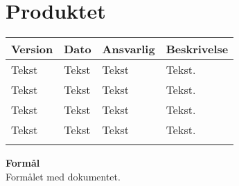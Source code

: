 \chapter{Produktet}\label{kapitel_Produktet}

\begin{longtabu} to 
    Version &    Dato &    Ansvarlig &    Beskrivelse\\[-1ex]
    \midrule
    Tekst &    Tekst &    Tekst &    Tekst.\\
    Tekst &    Tekst &    Tekst &    Tekst.\\
    Tekst &    Tekst &    Tekst &    Tekst.\\
    Tekst &    Tekst &    Tekst &    Tekst.\\
\label{version_Produktet}
\end{longtabu}

\textbf{Formål}\\
Formålet med dokumentet.